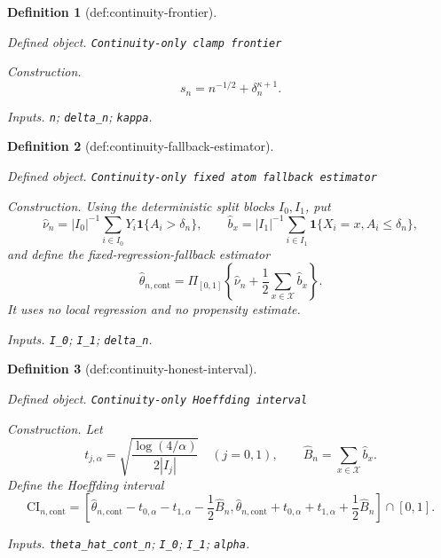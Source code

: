 \documentclass{article}
\newtheorem{definition}{Definition}
\begin{document}
\begin{definition}[def:continuity-frontier]\label{def:continuity-frontier}
\par\smallskip\noindent\emph{Defined object.} \texttt{Continuity-\allowbreak{}only clamp frontier}
\par\smallskip\noindent\emph{Construction.} \[
 s_n=n^{-1/2}+\delta_n^{\kappa+1}.
\]
\par\smallskip\noindent\emph{Inputs.} \texttt{n}; \texttt{delta\_\allowbreak{}n}; \texttt{kappa}.
\end{definition}

\begin{definition}[def:continuity-fallback-estimator]\label{def:continuity-fallback-estimator}
\par\smallskip\noindent\emph{Defined object.} \texttt{Continuity-\allowbreak{}only fixed atom fallback estimator}
\par\smallskip\noindent\emph{Construction.} Using the deterministic split blocks \(I_0,I_1\), put
\[
 \widehat\nu_n=|I_0|^{-1}\sum_{i\in I_0}Y_i\mathbf 1\{A_i>\delta_n\},
 \qquad
 \widehat b_x=|I_1|^{-1}\sum_{i\in I_1}\mathbf 1\{X_i=x,A_i\leq\delta_n\},
\]
and define the fixed-regression-fallback estimator
\[
 \widehat\theta_{n,\mathrm{cont}}
 =\Pi_{[0,1]}\left\{\widehat\nu_n+\frac12\sum_{x\in\mathcal X}\widehat b_x\right\}.
\]
It uses no local regression and no propensity estimate.
\par\smallskip\noindent\emph{Inputs.} \texttt{I\_\allowbreak{}0}; \texttt{I\_\allowbreak{}1}; \texttt{delta\_\allowbreak{}n}.
\end{definition}

\begin{definition}[def:continuity-honest-interval]\label{def:continuity-honest-interval}
\par\smallskip\noindent\emph{Defined object.} \texttt{Continuity-\allowbreak{}only Hoeffding interval}
\par\smallskip\noindent\emph{Construction.} Let
\[
 t_{j,\alpha}=\sqrt{\frac{\log(4/\alpha)}{2|I_j|}}
 \quad(j=0,1),
 \qquad \widehat B_n=\sum_{x\in\mathcal X}\widehat b_x.
\]
Define the Hoeffding interval
\[
 \mathrm{CI}_{n,\mathrm{cont}}
 =\left[
 \widehat\theta_{n,\mathrm{cont}}-t_{0,\alpha}-t_{1,\alpha}-\frac12\widehat B_n,
 \widehat\theta_{n,\mathrm{cont}}+t_{0,\alpha}+t_{1,\alpha}+\frac12\widehat B_n
 \right]\cap[0,1].
\]
\par\smallskip\noindent\emph{Inputs.} \texttt{theta\_\allowbreak{}hat\_\allowbreak{}cont\_\allowbreak{}n}; \texttt{I\_\allowbreak{}0}; \texttt{I\_\allowbreak{}1}; \texttt{alpha}.
\end{definition}
\end{document}
